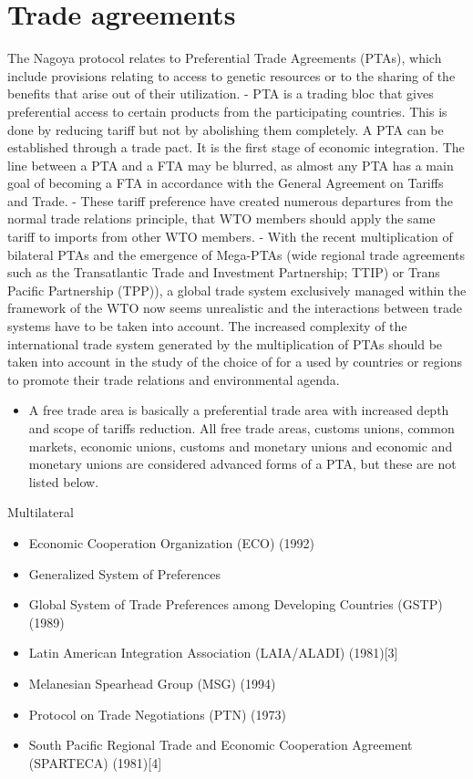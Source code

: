 \documentclass[
]{book}
\providecommand{\tightlist}{%
  \setlength{\itemsep}{0pt}\setlength{\parskip}{0pt}}
\begin{document}
\hypertarget{trade-agreements}{%
\section{Trade agreements}\label{trade-agreements}}

The Nagoya protocol relates to Preferential Trade Agreements (PTAs), which include provisions relating to access to genetic resources or to the sharing of the benefits that arise out of their utilization.
- PTA is a trading bloc that gives preferential access to certain products from the participating countries. This is done by reducing tariff but not by abolishing them completely. A PTA can be established through a trade pact. It is the first stage of economic integration. The line between a PTA and a FTA may be blurred, as almost any PTA has a main goal of becoming a FTA in accordance with the General Agreement on Tariffs and Trade.
- These tariff preference have created numerous departures from the normal trade relations principle, that WTO members should apply the same tariff to imports from other WTO members.
- With the recent multiplication of bilateral PTAs and the emergence of Mega-PTAs (wide regional trade agreements such as the Transatlantic Trade and Investment Partnership; TTIP) or Trans Pacific Partnership (TPP)), a global trade system exclusively managed within the framework of the WTO now seems unrealistic and the interactions between trade systems have to be taken into account. The increased complexity of the international trade system generated by the multiplication of PTAs should be taken into account in the study of the choice of for a used by countries or regions to promote their trade relations and environmental agenda.

\begin{itemize}
\tightlist
\item
  A free trade area is basically a preferential trade area with increased depth and scope of tariffs reduction. All free trade areas, customs unions, common markets, economic unions, customs and monetary unions and economic and monetary unions are considered advanced forms of a PTA, but these are not listed below.
\end{itemize}

Multilateral

\begin{itemize}
\tightlist
\item
  Economic Cooperation Organization (ECO) (1992)
\item
  Generalized System of Preferences
\item
  Global System of Trade Preferences among Developing Countries (GSTP) (1989)
\item
  Latin American Integration Association (LAIA/ALADI) (1981){[}3{]}
\item
  Melanesian Spearhead Group (MSG) (1994)
\item
  Protocol on Trade Negotiations (PTN) (1973)
\item
  South Pacific Regional Trade and Economic Cooperation Agreement (SPARTECA) (1981){[}4{]}
\end{itemize}
\end{document}
